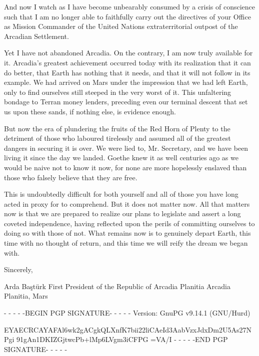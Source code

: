 And now I watch as I have become unbearably consumed by a crisis of conscience such that I am no longer able to faithfully carry out the directives of your Office as Mission Commander of the United Nations extraterritorial outpost of the Arcadian Settlement.

Yet I have not abandoned Arcadia. On the contrary, I am now truly available for it. Arcadia's greatest achievement occurred today with its realization that it can do better, that Earth has nothing that it needs, and that it will not follow in its example. We had arrived on Mars under the impression that we had left Earth, only to find ourselves still steeped in the very worst of it. This unfaltering bondage to Terran money lenders, preceding even our terminal descent that set us upon these sands, if nothing else, is evidence enough.

But now the era of plundering the fruits of the Red Horn of Plenty to the detriment of those who laboured tirelessly and assumed all of the greatest dangers in securing it is over. We were lied to, Mr. Secretary, and we have been living it since the day we landed. Goethe knew it as well centuries ago as we would be naive not to know it now, for none are more hopelessly enslaved than those who falsely believe that they are free.

This is undoubtedly difficult for both yourself and all of those you have long acted in proxy for to comprehend. But it does not matter now. All that matters now is that we are prepared to realize our plans to legislate and assert a long coveted independence, having reflected upon the perils of committing ourselves to doing so with those of not. What remains now is to genuinely depart Earth, this time with no thought of return, and this time we will reify the dream we began with.

Sincerely, 

\hskip 1.5cm 
   
Arda Baştürk
First President of the Republic of Arcadia Planitia
Arcadia Planitia, Mars

- - - - -BEGIN PGP SIGNATURE- - - - -
Version: GnuPG v9.14.1 (GNU/Hurd)

EYAECRCAYAFAl6wk2gACgkQLXnfK7bii22liCAeId3AabVzxJdxDm2U5As27NPgi
91gAn1DKIZGjtwcPb+lMp6LVgm3iCFPG
=VA/I
- - - - -END PGP SIGNATURE- - - - -

